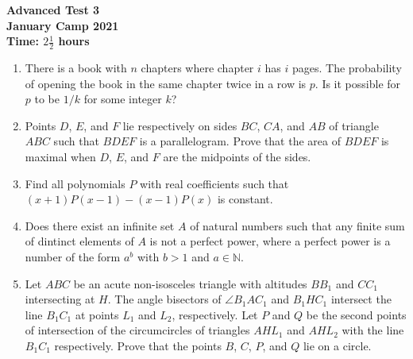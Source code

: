 \documentclass{article}
\begin{document}
\thispagestyle{empty}

\begin{center}
  \textbf{\Large Advanced Test 3}
  \\ \vspace{1em}
  \textbf{\large January Camp 2021}
  \\ \vspace{1em}
  \textbf{\large Time: $2\frac{1}{2}$ hours}
\end{center}

\vspace{12pt}

\begin{enumerate}[1.]

\item %
There is a book with $n$ chapters where chapter $i$ has $i$ pages.
The probability of opening the book in the same chapter twice in a row is $p$.
Is it possible for $p$ to be $1/k$ for some integer $k$?


\item %
Points $D$, $E$, and $F$ lie respectively on sides $BC$, $CA$, and $AB$ of triangle $ABC$ such that $BDEF$ is a parallelogram. Prove that the area of $BDEF$ is maximal when $D$, $E$, and $F$ are the midpoints of the sides.


\item %
Find all polynomials $P$ with real coefficients such that $(x + 1)P(x - 1) - (x - 1)P(x)$ is constant.


\item %
Does there exist an infinite set $A$ of natural numbers such that any finite sum of dintinct elements of $A$ is not a perfect power, where a perfect power is a number of the form $a^b$ with $b > 1$ and $a \in \mathbb{N}$.

\item %
Let $ABC$ be an acute non-isosceles triangle with altitudes $BB_1$ and $CC_1$ intersecting at $H$.
The angle bisectors of $\angle B_1AC_1$ and $B_1HC_1$ intersect the line $B_1C_1$ at points $L_1$ and $L_2$, respectively.
Let $P$ and $Q$ be the second points of intersection of the circumcircles of triangles $AHL_1$ and $AHL_2$ with the line $B_1C_1$ respectively.
Prove that the points $B$, $C$, $P$, and $Q$ lie on a circle.

\end{enumerate}
\end{document}

